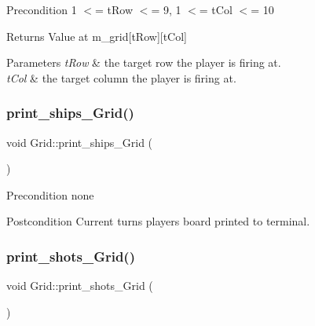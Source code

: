 \begin{DoxyPrecond}{Precondition}
1 $<$= t\+Row $<$= 9, 1 $<$= t\+Col $<$= 10 
\end{DoxyPrecond}
\begin{DoxyReturn}{Returns}
Value at m\+\_\+grid\mbox{[}t\+Row\mbox{]}\mbox{[}t\+Col\mbox{]} 
\end{DoxyReturn}

\begin{DoxyParams}{Parameters}
{\em t\+Row} & the target row the player is firing at. \\
\hline
{\em t\+Col} & the target column the player is firing at. \\
\hline
\end{DoxyParams}
\mbox{\label{classGrid_a8ae0f29a39c8bb700a20d0e6e865b801}} 
\subsubsection{\texorpdfstring{print\+\_\+ships\+\_\+\+Grid()}{print\_ships\_Grid()}}
{\footnotesize\ttfamily void Grid\+::print\+\_\+ships\+\_\+\+Grid (\begin{DoxyParamCaption}{ }\end{DoxyParamCaption})}

\begin{DoxyPrecond}{Precondition}
none 
\end{DoxyPrecond}
\begin{DoxyPostcond}{Postcondition}
Current turn\textquotesingle{}s player\textquotesingle{}s board printed to terminal. 
\end{DoxyPostcond}
\mbox{\label{classGrid_afddc50f6f34ad95f4f860c92fb7cf848}} 
\subsubsection{\texorpdfstring{print\+\_\+shots\+\_\+\+Grid()}{print\_shots\_Grid()}}
{\footnotesize\ttfamily void Grid\+::print\+\_\+shots\+\_\+\+Grid (\begin{DoxyParamCaption}{ }\end{DoxyParamCaption})}

